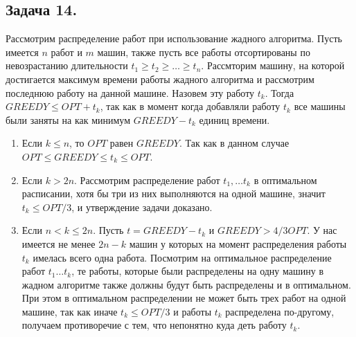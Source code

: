 \documentclass{article}
\begin{document}
\begin{enumerate}[a)]
\subsection*{Задача 14.}
Рассмотрим распределение работ при использование жадного алгоритма.
Пусть имеется $n$ работ и $m$ машин, также пусть все работы отсортированы
по невозрастанию длительности $t_1 \geq t_2 \geq \ldots \geq t_n$.
Рассмторим машину, на которой достигается максимум времени работы жадного
алгоритма и рассмотрим последнюю работу на данной машине. Назовем эту
работу $t_k$. Тогда $GREEDY \leq OPT + t_k$, так как в момент когда
добавляли работу $t_k$ все машины были заняты на как минимум $GREEDY - t_k$
единиц времени.
\begin{enumerate}
    \item
    Если $k \leq n$, то $OPT$ равен $GREEDY$.
    Так как в данном случае $OPT \leq GREEDY \leq t_k \leq OPT$.

    \item
    Если $k > 2n$. Рассмотрим распределение работ $t_1, \ldots t_k$
    в оптимальном расписании, хотя бы три из них выполняются на одной машине,
    значит $t_k \leq OPT/3$, и утверждение задачи доказано.

    \item
    Если $n < k \leq 2n$. Пусть $t = GREEDY - t_k$ и $GREEDY > 4/3 OPT$.
    У нас имеется не менее $2 n - k$ машин у которых на момент распределения
    работы $t_k$ имелась всего одна работа. Посмотрим на оптимальное
    распределение работ $t_1 \ldots t_k$, те работы, которые были
    распределены на одну машину в жадном алгоритме также должны будут
    быть распределены и в оптимальном. При этом в оптимальном
    распределении не может быть трех работ на одной машине, так как
    иначе $t_k \leq OPT / 3$ и работы $t_k$ распределена по-другому,
    получаем противоречие с тем, что непонятно куда деть работу $t_k$.
\end{enumerate}




\end{enumerate}
\end{document}

